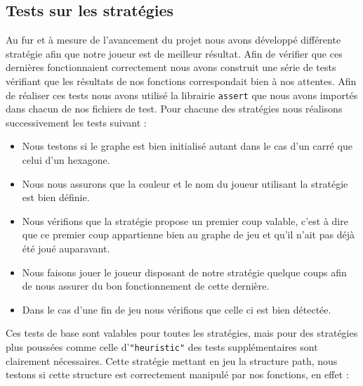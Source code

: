 \documentclass[a4paper,10pt]{article}
\begin{document}
\subsection{Tests sur les stratégies}
Au fur et à mesure de l'avancement du projet nous avons développé différente stratégie afin que notre joueur est de meilleur résultat. Afin de vérifier que ces dernières fonctionnaient correctement nous avons construit une série de tests vérifiant que les résultats de nos fonctions correspondait bien à nos attentes. Afin de réaliser ces tests nous avons utilisé la librairie \texttt{assert} que nous avons importés dans chacun de nos fichiers de test. Pour chacune des stratégies nous réalisons successivement les tests suivant : \\
\begin{itemize}
    \item Nous testons si le graphe est bien initialisé autant dans le cas d'un carré que celui d'un hexagone. \\
    \item Nous nous assurons que la couleur et le nom du joueur utilisant la stratégie est bien définie. \\
    \item Nous vérifions que la stratégie propose un premier coup valable, c'est à dire que ce premier coup appartienne bien au graphe de jeu et qu'il n'ait pas déjà été joué auparavant. \\
    \item Nous faisons jouer le joueur disposant de notre stratégie quelque coups afin de nous assurer du bon fonctionnement de cette dernière. \\
    \item Dans le cas d'une fin de jeu nous vérifions que celle ci est bien détectée.\\
\end{itemize}

Ces tests de base sont valables pour toutes les stratégies, mais pour des stratégies plus poussées comme celle d'\texttt{"heuristic"} des tests supplémentaires sont clairement nécessaires. Cette stratégie mettant en jeu la structure path, nous testons si cette structure est correctement manipulé par nos fonctions, en effet : \\
\end{document}
